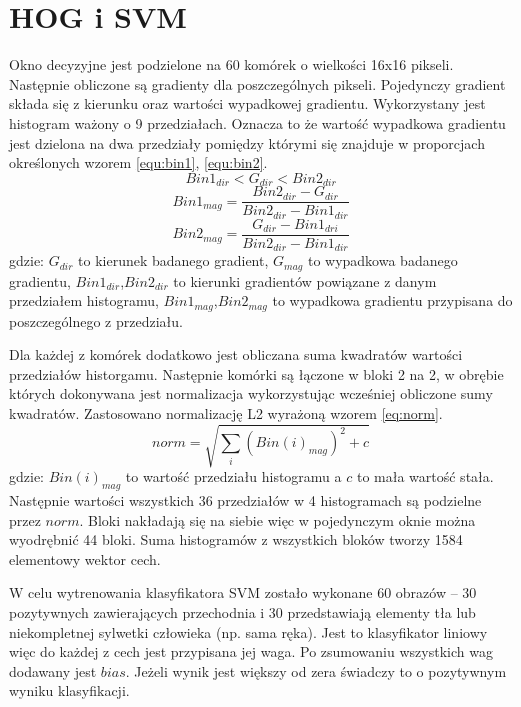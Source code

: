 \section{HOG i SVM}
Okno decyzyjne jest podzielone na 60 komórek o wielkości 16x16 pikseli. 
Następnie obliczone są gradienty dla poszczególnych pikseli. Pojedynczy gradient składa się z kierunku oraz wartości wypadkowej gradientu. Wykorzystany jest histogram ważony o 9 przedziałach. Oznacza to że wartość wypadkowa gradientu jest dzielona na dwa przedziały pomiędzy którymi się znajduje w proporcjach określonych wzorem \eqref{equ:bin1},  \eqref{equ:bin2}. 
\begin{equation}\label{equ:bin0}
Bin1_{dir} < G_{dir} < Bin2_{dir}
\end{equation}
\begin{equation}\label{equ:bin1}
Bin1_{mag} = \frac{Bin2_{dir} - G_{dir}}{Bin2_{dir} - Bin1_{dir}}
\end{equation}
\begin{equation}\label{equ:bin2}
Bin2_{mag} = \frac{G_{dir}- Bin1_{dri}}{Bin2_{dir} - Bin1_{dir}} 
\end{equation}
\noindent gdzie: $G_{dir}$ to kierunek badanego gradient, $G_{mag}$ to wypadkowa badanego gradientu, $Bin1_{dir}$,$Bin2_{dir}$ to kierunki gradientów powiązane z danym przedziałem histogramu, $Bin1_{mag}$,$Bin2_{mag}$ to wypadkowa gradientu przypisana do poszczególnego z przedziału.

Dla każdej z komórek dodatkowo jest obliczana suma kwadratów wartości przedziałów historgamu.
Następnie komórki są łączone w bloki 2 na 2, w obrębie których dokonywana jest normalizacja wykorzystując wcześniej obliczone sumy kwadratów. Zastosowano normalizację L2 wyrażoną wzorem \eqref{eq:norm}.
\begin{equation}\label{eq:norm}
norm = \sqrt{\sum_{i} (Bin(i)_{mag})^2 + c}
\end{equation}
\noindent gdzie: $Bin(i)_{mag}$ to wartość przedziału histogramu a $c$ to mała wartość stała.
Następnie wartości wszystkich 36 przedziałów w 4 histogramach są podzielne przez $norm$.
Bloki nakładają się na siebie więc w pojedynczym oknie można wyodrębnić 44 bloki. %
Suma histogramów z wszystkich bloków tworzy 1584 elementowy wektor cech. 

W celu wytrenowania klasyfikatora SVM zostało wykonane 60 obrazów – 30 pozytywnych zawierających przechodnia i 30 przedstawiają elementy tła lub niekompletnej sylwetki człowieka (np. sama ręka). 
Jest to klasyfikator liniowy więc do każdej z cech jest przypisana jej waga. Po zsumowaniu wszystkich wag dodawany jest $bias$. Jeżeli wynik jest większy od zera świadczy to o pozytywnym wyniku klasyfikacji. 


